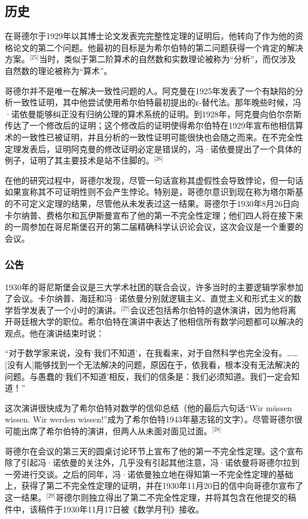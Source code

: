 \subsection{历史}  
在哥德尔于1929年以其博士论文发表完完整性定理的证明后，他转向了作为他的资格论文的第二个问题。他最初的目标是为希尔伯特的第二问题获得一个肯定的解决方案。\(^\text{[25]}\)当时，类似于第二阶算术的自然数和实数理论被称为“分析”，而仅涉及自然数的理论被称为“算术”。

哥德尔并不是唯一在解决一致性问题的人。阿克曼在1925年发表了一个有缺陷的分析一致性证明，其中他尝试使用希尔伯特最初提出的ε-替代法。那年晚些时候，冯·诺依曼能够纠正没有归纳公理的算术系统的证明。到1928年，阿克曼向伯尔奈斯传达了一个修改后的证明；这个修改后的证明使得希尔伯特在1929年宣布他相信算术的一致性已被证明，并且分析的一致性证明可能很快也会随之而来。在不完全性定理发表后，证明阿克曼的修改证明必定是错误的，冯·诺依曼提出了一个具体的例子，证明了其主要技术是站不住脚的。\(^\text{[26]}\)

在他的研究过程中，哥德尔发现，尽管一句话宣称其虚假性会导致悖论，但一句话如果宣称其不可证明性则不会产生悖论。特别是，哥德尔意识到现在称为塔尔斯基的不可定义定理的结果，尽管他从未发表过这一结果。哥德尔于1930年8月26日向卡尔纳普、费格尔和瓦伊斯曼宣布了他的第一不完全性定理；他们四人将在接下来的一周参加在哥尼斯堡召开的第二届精确科学认识论会议，这次会议是一个重要的会议。
\subsubsection{公告} 
1930年的哥尼斯堡会议是三大学术社团的联合会议，许多当时的主要逻辑学家参加了会议。卡尔纳普、海廷和冯·诺依曼分别就逻辑主义、直觉主义和形式主义的数学哲学发表了一个小时的演讲。\(^\text{[27]}\)会议还包括希尔伯特的退休演讲，因为他将离开哥廷根大学的职位。希尔伯特在演讲中表达了他相信所有数学问题都可以解决的观点。他在演讲结束时说：

“对于数学家来说，没有‘我们不知道’，在我看来，对于自然科学也完全没有。……[没有人]能够找到一个无法解决的问题，原因在于，依我看，根本没有无法解决的问题。与愚蠢的‘我们不知道’相反，我们的信条是：我们必须知道。我们一定会知道！”

这次演讲很快成为了希尔伯特对数学的信仰总结（他的最后六句话“Wir müssen wissen. Wir werden wissen!”成为了希尔伯特1943年墓志铭的文字）。尽管哥德尔很可能出席了希尔伯特的演讲，但两人从未面对面见过面。\(^\text{[28]}\)

哥德尔在会议的第三天的圆桌讨论环节上宣布了他的第一不完全性定理。这个宣布除了引起冯·诺依曼的关注外，几乎没有引起其他注意，冯·诺依曼将哥德尔拉到一旁进行交谈。之后的同年，冯·诺依曼独立地在得知第一不完全性定理的基础上，获得了第二不完全性定理的证明，并在1930年11月20日的信中向哥德尔宣布了这一结果。\(^\text{[29]}\)哥德尔则独立得出了第二不完全性定理，并将其包含在他提交的稿件中，该稿件于1930年11月17日被《数学月刊》接收。

